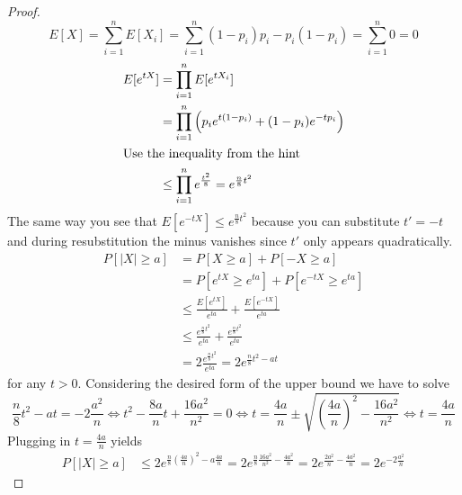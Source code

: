 \documentclass[10pt,a4paper]{article}
\begin{document}
\begin{proof}
  \begin{equation*}
    E[X] = \sum_{i = 1}^{n} E[X_{i}] = \sum_{i = 1}^{n} (1 - p_{i})p_{i} - p_{i}(1 - p_{i}) = \sum_{i = 1}^{n} 0 = 0
  \end{equation*}
  \begin{align*}
    E[e^{tX}] & = \prod_{i = 1}^{n} E[e^{tX_{i}}]\\
              & = \prod_{i = 1}^{n} \left(p_{i}e^{t(1 - p_{i})} + (1 - p_{i})e^{-tp_{i}}\right)\\
    \intertext{Use the inequality from the hint}
              & \le \prod_{i = 1}^{n} e^{\frac{t^{2}}{8}} = e^{\frac{n}{8}t^{2}}\\
  \end{align*}
  The same way you see that $E[e^{-tX}] \le e^{\frac{n}{8}t^{2}}$ because you can substitute $t' = -t$ and during resubstitution the minus vanishes since $t'$ only appears quadratically.
  \begin{align*}
    P[|X| \ge a] & = P[X \ge a] + P[-X \ge a]\\
                 & = P[e^{tX} \ge e^{ta}] + P[e^{-tX} \ge e^{ta}]\\
                 & \le \frac{E[e^{tX}]}{e^{ta}} + \frac{E[e^{-tX}]}{e^{ta}}\\
                 & \le \frac{e^{\frac{n}{8}t^{2}}}{e^{ta}} + \frac{e^{\frac{n}{8}t^{2}}}{e^{ta}}\\
                 & = 2 \frac{e^{\frac{n}{8}t^{2}}}{e^{ta}} = 2e^{\frac{n}{8}t^{2} - at}
  \end{align*}
  for any $t > 0$.
  Considering the desired form of the upper bound we have to solve
  \begin{equation*}
    \frac{n}{8}t^{2} - at = -2 \frac{a^{2}}{n} \Leftrightarrow t^{2} - \frac{8a}{n}t + \frac{16a^{2}}{n^{2}} = 0 \Leftrightarrow t = \frac{4a}{n} \pm \sqrt{\left( \frac{4a}{n} \right)^{2} - \frac{16a^{2}}{n^{2}}} \Leftrightarrow t = \frac{4a}{n}
  \end{equation*}
  Plugging in $t = \frac{4a}{n}$ yields
  \begin{align*}
    P[|X| \ge a] & \le 2e^{\frac{n}{8}\left( \frac{4a}{n} \right)^{2} - a \frac{4a}{n}} = 2e^{\frac{n}{8} \frac{16a^{2}}{n^{2}} - \frac{4a^{2}}{n}} = 2e^{\frac{2a^{2}}{n} - \frac{4a^{2}}{n}} = 2e^{-2\frac{a^{2}}{n}}
  \end{align*}
\end{proof}
\end{document}
